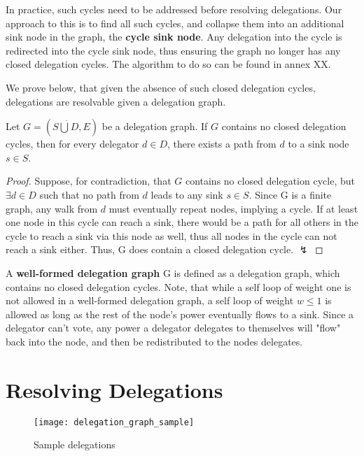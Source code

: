 In practice, such cycles need to be addressed before resolving delegations. Our approach to this is to find all such cycles, and collapse them into an additional sink node in the graph, the \textbf{cycle sink node}. Any delegation into the cycle is redirected into the cycle sink node,  thus ensuring the graph no longer has any closed delegation cycles. The algorithm to do so can be found in annex XX.  

We prove below, that given the absence of such closed delegation cycles, delegations are resolvable given a delegation graph. 

\begin{theorem}
Let $G = (S \dot\bigcup D, E)$ be a delegation graph. If $G$ contains no closed delegation cycles, then for every delegator $d \in D$, there exists a path from $d$ to a sink node $s \in S$.
\end{theorem}
\begin{proof}
Suppose, for contradiction, that $G$ contains no closed delegation cycle, but $\exists d \in D$ such that no path from $d$ leads to any sink $s \in S$. Since G is a finite graph, any walk from $d$ must eventually repeat nodes, implying a cycle. If at least one node in this cycle can reach a sink, there would be a path for all others in the cycle to reach a sink via this node as well, thus all nodes in the cycle can not reach a sink either. Thus, G does contain a closed delegation cycle. $\lightning$
\end{proof}

 A \textbf{well-formed delegation graph} G is defined as a delegation graph, which contains no closed delegation cycles. Note, that while a self loop of weight one is not allowed in a well-formed delegation graph, a self loop of weight $w \le 1$ is allowed as long as the rest of the node's power eventually flows to a sink. Since a delegator can't vote, any power a delegator delegates to themselves will "flow" back into the node, and then be redistributed to the nodes delegates. 

\section{Resolving Delegations}

\begin{figure}[t]
	\centering
	\texttt{[image: delegation\_graph\_sample]}
	\caption{Sample delegations}
	\label{fig:sample_delegations}
\end{figure}

